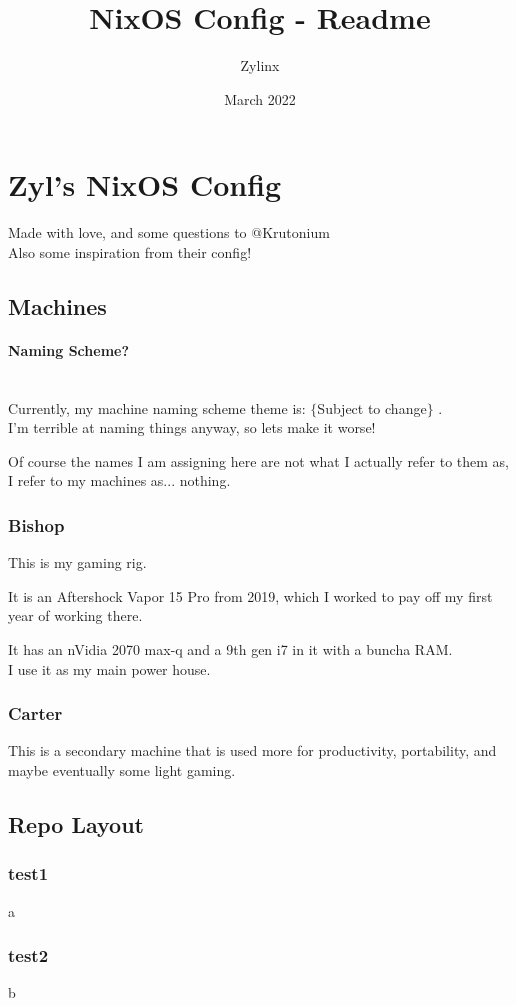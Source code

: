 \documentclass{article}
\title{NixOS Config - Readme}
\author{Zylinx}
\date{March 2022}
\begin{document}
\section{Zyl's NixOS Config}
Made with love, and some questions to @Krutonium\\
Also some inspiration from their config!

\tableofcontents

\subsection{Machines}
\paragraph{Naming Scheme?}\mbox{}\\
Currently, my machine naming scheme theme is: $\{$Subject to change$\}$ .\\
I'm terrible at naming things anyway, so lets make it worse!

Of course the names I am assigning here are not what I actually refer to them as, I refer to my machines as... nothing.

\subsubsection{Bishop}
This is my gaming rig.

It is an Aftershock Vapor 15 Pro from 2019, which I worked to pay off my first year of working there.

It has an nVidia 2070 max-q and a 9th gen i7 in it with a buncha RAM.\\
I use it as my main power house.

\subsubsection{Carter}
This is a secondary machine that is used more for productivity, portability, and maybe eventually some light gaming.

\subsection{Repo Layout}
\subsubsection{test1}
a

\subsubsection{test2}
b
\end{document}
